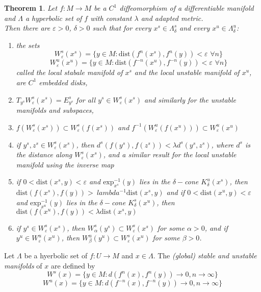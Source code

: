 \documentclass{article}
\newtheorem{thm}{Theorem}
\begin{document}
\begin{thm}

Let $f:M \to M$ be a $C^1$ diffeomorphism of a differentiable manifold and $\Lambda$ a hyperbolic set of $f$ with constant $\lambda$ and adapted metric.\\
\indent Then there are $\varepsilon >0$, $\delta > 0$ such that for every $x^s \in \Lambda^s_{\delta}$ and every $x^u \in \Lambda^u_{\delta}$:

\begin{enumerate}
    \item the sets
    \[W^s_{\varepsilon}(x^s) = \{ y \in M : \mathrm{dist}(f^n(x^s), f^n(y)) < \varepsilon \hspace{4pt} \forall n \}\]
    \[
    W^u_{\varepsilon}(x^u) = \{ y \in M: \mathrm{dist}(f^{-n}(x^u), f^{-n}(y)) < \varepsilon \hspace{4pt} \forall n\}
    \]
    called the local stabale manifold of $x^s$ and the local unstable manifold of $x^u$, are $C^1$ embedded disks,
    \item $T_{y^s}W^s_{\varepsilon}(x^s) = E^s_{y^s}$ for all $y^s \in W^s_{\varepsilon}(x^s)$ and similarly for the unstable manifolds and subspaces,
    \item $f(W^s_{\varepsilon}(x^s)) \subset W^s_{\varepsilon}(f(x^s))$ and $f^{-1}(W^u_{\varepsilon}(f(x^u))) \subset W^u_{\varepsilon}(x^u)$
    \item if $y^s, z^s \in W^s_{\varepsilon}(x^s)$, then $d^s(f(y^s),f(z^s)) < \lambda d^s(y^s, z^s)$, where $d^s$ is the distance along $W^s_{\varepsilon}(x^s)$, and a similar result for the local unstable manifold using the inverse map
    \item if $0 < \mathrm{dist}(x^s,y) < \varepsilon$ and $\mathrm{exp}^{-1}_{x^s}(y)$ lies in the $\delta-$cone $K^u_{\delta}(x^s)$, then $\mathrm{dist}(f(x^s),f(y)) >\ lambda^{-1} \mathrm{dist}(x^s,y)$ and if $0 < \mathrm{dist}(x^u,y) < \varepsilon $ and $\mathrm{exp}^{-1}_{x^u}(y)$ lies in the $\delta-$cone $K^s_{\delta}(x^u)$, then $\mathrm{dist}(f(x^u),f(y)) < \lambda \mathrm{dist}(x^s,y)$
    \item if $y^s \in W^s_{\varepsilon}(x^s)$, then $W^s_{\alpha}(y^s) \subset W^s_{\varepsilon}(x^s)$ for some $\alpha > 0$, and if $y^u \in W^u_{\varepsilon}(x^u)$, then $W^u_{\beta}(y^u) \subset W^s_{\varepsilon}(x^u)$ for some $\beta > 0$.
\end{enumerate}
\end{thm}

Let $\Lambda$ be a hyerbolic set of $f:U \to M$ and $x \in \Lambda$. The \textit{(global) stable and unstable manifolds} of $x$ are defined by 
\[
W^s(x) = \{ y \in M: d(f^n(x), f^n(y)) \to 0, n \to \infty \}
\]
\[
W^u(x) = \{ y \in M: d(f^{-n}(x), f^{-n}(y)) \to 0, n \to \infty \}
\]
\end{document}
